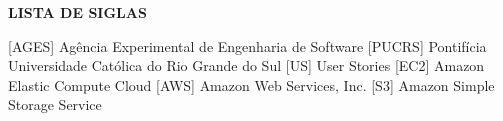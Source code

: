 
\begin{center}
  \uppercase{\bfseries lista de siglas}\\[3em]
\end{center}

\begin{acronym}[XXXXXXXX]
   [AGES] {Agência Experimental de Engenharia de Software}
   [PUCRS] {Pontifícia Universidade Católica do Rio Grande do Sul}
   [US] {User Stories}
   [EC2] {Amazon Elastic Compute Cloud}
   [AWS] {Amazon Web Services, Inc.}
   [S3] {Amazon Simple Storage Service}
\end{acronym}